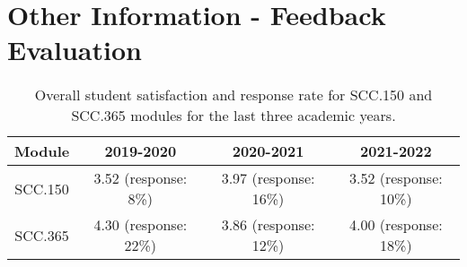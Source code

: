 \documentclass[10pt, a4paper]{article}
\begin{document}
\section{Other Information - Feedback Evaluation}

\begin{table}[h]
\begin{tabular}{|c|c|c|c|}
\hline
Module & 2019-2020 & 2020-2021 & 2021-2022 \\
\hline
SCC.150 & 3.52 (response: 8\%) & 3.97 (response: 16\%) & 3.52 (response: 10\%) \\
\hline
SCC.365 & 4.30 (response: 22\%) & 3.86 (response: 12\%) & 4.00 (response: 18\%) \\
\hline
\end{tabular}
\caption{Overall student satisfaction and response rate for SCC.150 and SCC.365
modules for the last three academic years.}
\end{table}
\end{document}
